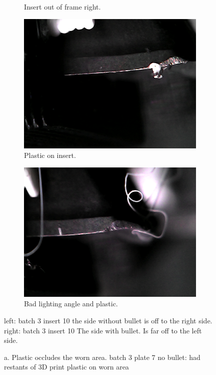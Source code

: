 \begin{figure}[hbtp]
\begin{subfigure}{0.49\textwidth}
		\caption{Insert out of frame right.}
	\end{subfigure}
	\hspace*{\fill}
	\begin{subfigure}{0.49\textwidth}
		\includegraphics[width=\linewidth, keepaspectratio=true]{fig/Vision/Dataset/automated_datasets/2_created_datasets/1_Birthday_dataset/error/b_003_p_007_l_000_nb.png}
		\caption{Plastic on insert.}
	\end{subfigure}
	\hspace*{\fill}
	\begin{subfigure}{0.49\textwidth}
		\includegraphics[width=\linewidth, keepaspectratio=true]{fig/Vision/Dataset/automated_datasets/2_created_datasets/1_Birthday_dataset/error/b_005_p_006_l_000_b.png} 
		\caption{Bad lighting angle and plastic.}
	\end{subfigure}
	\caption{left: batch 3 insert 10 the side without bullet is off to the right side. right: batch 3 insert 10 The side with bullet. Is far off to the left side.}
\caption{a. Plastic occludes the worn area. batch 3 plate 7 no bullet:  had restants of 3D print plastic on worn area}
\label{fig:dataset:birthday:error}
\end{figure}

